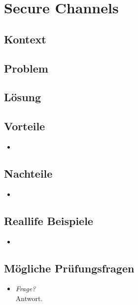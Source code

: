 \section{Secure Channels}

\subsection*{Kontext}


\subsection*{Problem}


\subsection*{Lösung}


\subsection*{Vorteile}
\begin{itemize}
	\item 
\end{itemize}

\subsection*{Nachteile}
\begin{itemize}
	\item 
\end{itemize}

\subsection*{Reallife Beispiele}
\begin{itemize}
	\item 
\end{itemize}

\subsection*{Mögliche Prüfungsfragen}
\begin{itemize}
	\item \emph{Frage?}\\
	Antwort.
\end{itemize}